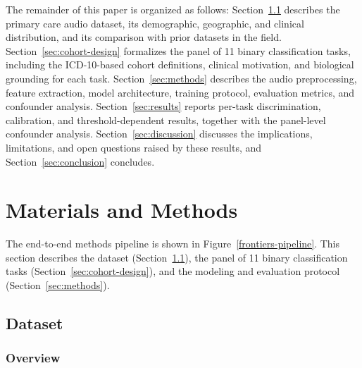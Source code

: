 \documentclass[utf8]{FrontiersinHarvard} %
\begin{document}
The remainder of this paper is organized as follows: Section~\ref{sec:dataset} describes the primary care audio dataset, its demographic, geographic, and clinical distribution, and its comparison with prior datasets in the field. Section~\ref{sec:cohort-design} formalizes the panel of 11 binary classification tasks, including the ICD-10-based cohort definitions, clinical motivation, and biological grounding for each task. Section~\ref{sec:methods} describes the audio preprocessing, feature extraction, model architecture, training protocol, evaluation metrics, and confounder analysis. Section~\ref{sec:results} reports per-task discrimination, calibration, and threshold-dependent results, together with the panel-level confounder analysis. Section~\ref{sec:discussion} discusses the implications, limitations, and open questions raised by these results, and Section~\ref{sec:conclusion} concludes.



\section{Materials and Methods}
\label{sec:materials-methods}

The end-to-end methods pipeline is shown in Figure~\ref{frontiers-pipeline}. This section describes the dataset (Section~\ref{sec:dataset}), the panel of 11 binary classification tasks (Section~\ref{sec:cohort-design}), and the modeling and evaluation protocol (Section~\ref{sec:methods}).

\subsection{Dataset}
\label{sec:dataset}

\subsubsection{Overview}
\end{document}
